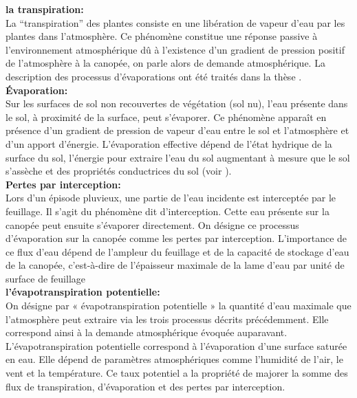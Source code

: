 \documentclass[a4paper,10pt]{article}
\begin{document}
\textbf{la transpiration:}\\

La ``transpiration'' des plantes consiste en une libération de vapeur d’eau par les plantes dans l’atmosphère. Ce phénomène constitue une réponse passive à l’environnement atmosphérique dû à l’existence d’un gradient de pression positif de l’atmosphère à la canopée, on parle alors de demande atmosphérique. La description des processus d'évaporations ont été traités dans la thèse \cite{maquin2016developpement}.\\

\textbf{Évaporation:}\\

Sur les surfaces de sol non recouvertes de végétation (sol nu), l’eau présente dans le sol, à proximité de la surface, peut s’évaporer. Ce phénomène apparaît en présence d’un gradient de pression de vapeur d’eau entre le sol et l’atmosphère et d’un apport d’énergie. L’évaporation effective dépend de l’état hydrique de la surface du sol, l’énergie pour extraire l’eau du sol augmentant à mesure que le sol s’assèche et des propriétés conductrices du sol (voir \cite{hillel2003introduction}). \\

\textbf{Pertes par interception:}\\

Lors d’un épisode pluvieux, une partie de l’eau incidente est interceptée par le feuillage. Il s’agit du phénomène dit d’interception. Cette eau présente sur la canopée peut ensuite s’évaporer directement. On désigne ce processus d’évaporation sur la canopée comme les pertes par interception. L’importance de ce flux d’eau dépend de l’ampleur du feuillage et de la capacité de stockage d’eau de la canopée, c’est-à-dire de l’épaisseur maximale de la lame d’eau par unité de surface de feuillage\\


\textbf{l'évapotranspiration potentielle:}\\

On désigne par « évapotranspiration potentielle » la quantité d’eau maximale que l’atmosphère peut extraire via les trois processus décrits précédemment. Elle correspond ainsi à la demande atmosphérique évoquée auparavant. L’évapotranspiration potentielle correspond à l’évaporation d’une surface saturée en eau. Elle dépend de paramètres atmosphériques comme l’humidité de l’air, le vent et la température. Ce taux potentiel a la propriété de majorer la somme des flux de transpiration, d’évaporation et des pertes par interception.
\end{document}
